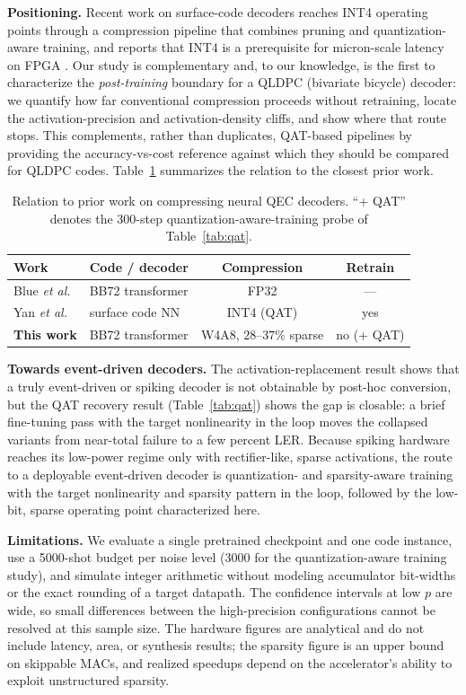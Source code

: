 ﻿\documentclass[conference]{IEEEtran}
\begin{document}
\textbf{Positioning.} Recent work on surface-code decoders reaches INT4
operating points through a compression pipeline that combines pruning and
quantization-aware training, and reports that INT4 is a prerequisite for
micron-scale latency on FPGA \cite{rethink2026}. Our study is complementary
and, to our knowledge, is the first to characterize the \emph{post-training}
boundary for a QLDPC (bivariate bicycle) decoder: we quantify how far
conventional compression proceeds without retraining, locate the
activation-precision and activation-density cliffs, and show where that
route stops. This complements, rather than duplicates, QAT-based pipelines
by providing the accuracy-vs-cost reference against which they should be
compared for QLDPC codes. Table~\ref{tab:prior} summarizes the relation to
the closest prior work.
\begin{table}[t]
\caption{Relation to prior work on compressing neural QEC decoders. ``+ QAT'' denotes the 300-step quantization-aware-training probe of Table~\ref{tab:qat}.}
\label{tab:prior}
\centering
\footnotesize
\setlength{\tabcolsep}{2.5pt}
\begin{tabular}{llcc}
\toprule
Work & Code / decoder & Compression & Retrain \\
\midrule
Blue \emph{et al.}\ \cite{blue2026} & BB72 transformer & FP32 & --- \\
Yan \emph{et al.}\ \cite{rethink2026} & surface code NN & INT4 (QAT) & yes \\
\textbf{This work} & BB72 transformer & W4A8{,} $28$--$37\%$ sparse & no (+ QAT) \\
\bottomrule
\end{tabular}
\end{table}
\textbf{Towards event-driven decoders.} The activation-replacement result
shows that a truly event-driven or spiking decoder is not obtainable by
post-hoc conversion, but the QAT recovery result (Table~\ref{tab:qat})
shows the gap is closable: a brief fine-tuning pass with the target
nonlinearity in the loop moves the collapsed variants from near-total
failure to a few percent LER. Because spiking hardware reaches its
low-power regime only with rectifier-like, sparse activations, the route
to a deployable event-driven decoder is quantization- and sparsity-aware
training with the target nonlinearity and sparsity pattern in the loop,
followed by the low-bit, sparse operating point characterized here.

\textbf{Limitations.} We evaluate a single pretrained checkpoint and one
code instance, use a 5000-shot budget per noise level (3000 for the
quantization-aware training study), and simulate
integer arithmetic without modeling accumulator bit-widths or the exact
rounding of a target datapath. The confidence intervals at low $p$ are
wide, so small differences between the high-precision configurations cannot
be resolved at this sample size. The hardware figures are analytical and do
not include latency, area, or synthesis results; the sparsity figure is an
upper bound on skippable MACs, and realized speedups depend on the
accelerator's ability to exploit unstructured sparsity.
\end{document}
